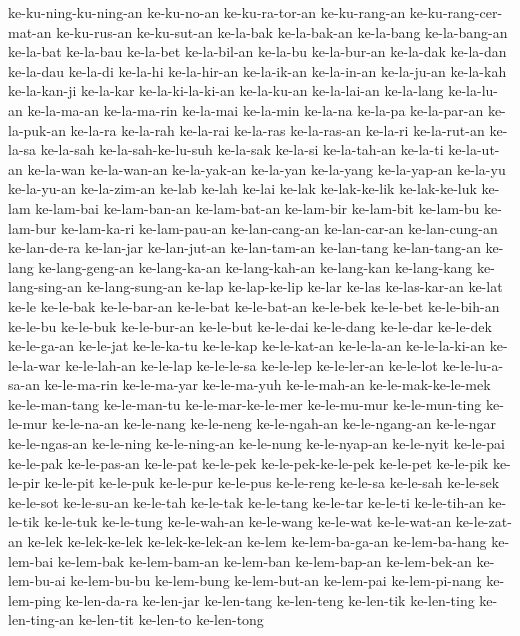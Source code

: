 {ke-ku-ning-ku-ning-an ke-ku-no-an ke-ku-ra-tor-an ke-ku-rang-an
ke-ku-rang-cer-mat-an ke-ku-rus-an ke-ku-sut-an ke-la-bak ke-la-bak-an
ke-la-bang ke-la-bang-an ke-la-bat ke-la-bau ke-la-bet ke-la-bil-an
ke-la-bu ke-la-bur-an ke-la-dak ke-la-dan ke-la-dau ke-la-di ke-la-hi
ke-la-hir-an ke-la-ik-an ke-la-in-an ke-la-ju-an ke-la-kah ke-la-kan-ji
ke-la-kar ke-la-ki-la-ki-an ke-la-ku-an ke-la-lai-an ke-la-lang
ke-la-lu-an ke-la-ma-an ke-la-ma-rin ke-la-mai ke-la-min ke-la-na ke-la-pa
ke-la-par-an ke-la-puk-an ke-la-ra ke-la-rah ke-la-rai ke-la-ras
ke-la-ras-an ke-la-ri ke-la-rut-an ke-la-sa ke-la-sah ke-la-sah-ke-lu-suh
ke-la-sak ke-la-si ke-la-tah-an ke-la-ti ke-la-ut-an ke-la-wan
ke-la-wan-an ke-la-yak-an ke-la-yan ke-la-yang ke-la-yap-an ke-la-yu
ke-la-yu-an ke-la-zim-an ke-lab ke-lah ke-lai ke-lak ke-lak-ke-lik
ke-lak-ke-luk ke-lam ke-lam-bai ke-lam-ban-an ke-lam-bat-an ke-lam-bir
ke-lam-bit ke-lam-bu ke-lam-bur ke-lam-ka-ri ke-lam-pau-an ke-lan-cang-an
ke-lan-car-an ke-lan-cung-an ke-lan-de-ra ke-lan-jar ke-lan-jut-an
ke-lan-tam-an ke-lan-tang ke-lan-tang-an ke-lang ke-lang-geng-an
ke-lang-ka-an ke-lang-kah-an ke-lang-kan ke-lang-kang ke-lang-sing-an
ke-lang-sung-an ke-lap ke-lap-ke-lip ke-lar ke-las ke-las-kar-an ke-lat
ke-le ke-le-bak ke-le-bar-an ke-le-bat ke-le-bat-an ke-le-bek ke-le-bet
ke-le-bih-an ke-le-bu ke-le-buk ke-le-bur-an ke-le-but ke-le-dai
ke-le-dang ke-le-dar ke-le-dek ke-le-ga-an ke-le-jat ke-le-ka-tu ke-le-kap
ke-le-kat-an ke-le-la-an ke-le-la-ki-an ke-le-la-war ke-le-lah-an
ke-le-lap ke-le-le-sa ke-le-lep ke-le-ler-an ke-le-lot ke-le-lu-a-sa-an
ke-le-ma-rin ke-le-ma-yar ke-le-ma-yuh ke-le-mah-an ke-le-mak-ke-le-mek
ke-le-man-tang ke-le-man-tu ke-le-mar-ke-le-mer ke-le-mu-mur
ke-le-mun-ting ke-le-mur ke-le-na-an ke-le-nang ke-le-neng ke-le-ngah-an
ke-le-ngang-an ke-le-ngar ke-le-ngas-an ke-le-ning ke-le-ning-an
ke-le-nung ke-le-nyap-an ke-le-nyit ke-le-pai ke-le-pak ke-le-pas-an
ke-le-pat ke-le-pek ke-le-pek-ke-le-pek ke-le-pet ke-le-pik ke-le-pir
ke-le-pit ke-le-puk ke-le-pur ke-le-pus ke-le-reng ke-le-sa ke-le-sah
ke-le-sek ke-le-sot ke-le-su-an ke-le-tah ke-le-tak ke-le-tang ke-le-tar
ke-le-ti ke-le-tih-an ke-le-tik ke-le-tuk ke-le-tung ke-le-wah-an
ke-le-wang ke-le-wat ke-le-wat-an ke-le-zat-an ke-lek ke-lek-ke-lek
ke-lek-ke-lek-an ke-lem ke-lem-ba-ga-an ke-lem-ba-hang ke-lem-bai
ke-lem-bak ke-lem-bam-an ke-lem-ban ke-lem-bap-an ke-lem-bek-an
ke-lem-bu-ai ke-lem-bu-bu ke-lem-bung ke-lem-but-an ke-lem-pai
ke-lem-pi-nang ke-lem-ping ke-len-da-ra ke-len-jar ke-len-tang ke-len-teng
ke-len-tik ke-len-ting ke-len-ting-an ke-len-tit ke-len-to ke-len-tong
}
